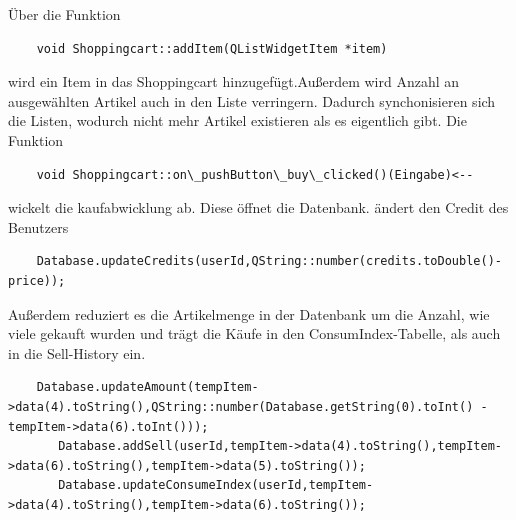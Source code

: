 \documentclass[11pt,a4paper]{article} %
\begin{document}
	Über die Funktion 
	\begin{frame}

\begin{lstlisting}
	void Shoppingcart::addItem(QListWidgetItem *item)
		\end{lstlisting}
\end{frame}
	 wird ein Item in das Shoppingcart hinzugefügt.Außerdem wird Anzahl an ausgewählten Artikel auch in den Liste verringern.
	Dadurch synchonisieren sich die Listen, wodurch nicht mehr Artikel existieren als es eigentlich gibt.
	Die Funktion
	\begin{frame}

\begin{lstlisting}
	void Shoppingcart::on\_pushButton\_buy\_clicked()(Eingabe)<--
	\end{lstlisting}
\end{frame}
	    wickelt die kaufabwicklung ab. Diese öffnet die Datenbank. ändert den Credit des Benutzers
	    
	\begin{frame}

\begin{lstlisting}
	Database.updateCredits(userId,QString::number(credits.toDouble()-price));
	\end{lstlisting}
\end{frame}
	Außerdem reduziert es die Artikelmenge in der Datenbank um die Anzahl, wie viele gekauft wurden und trägt die Käufe in den ConsumIndex-Tabelle, als auch in die Sell-History ein.
	\begin{frame}

\begin{lstlisting}
	Database.updateAmount(tempItem->data(4).toString(),QString::number(Database.getString(0).toInt() - tempItem->data(6).toInt()));
	   Database.addSell(userId,tempItem->data(4).toString(),tempItem->data(6).toString(),tempItem->data(5).toString());
       Database.updateConsumeIndex(userId,tempItem->data(4).toString(),tempItem->data(6).toString());
       \end{lstlisting}
\end{frame}
\par	   
\end{document}
